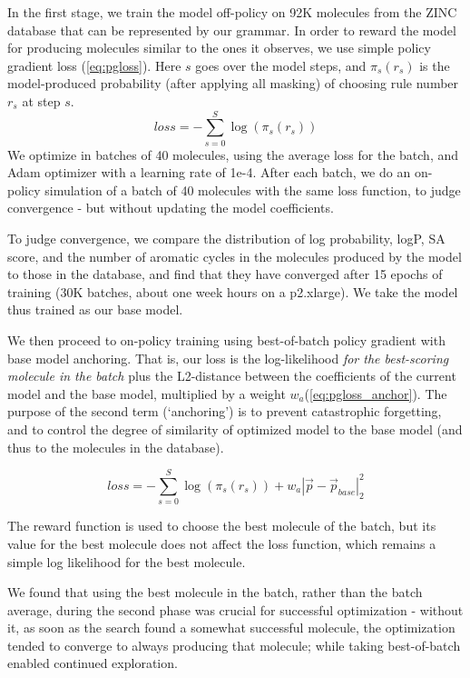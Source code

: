 \documentclass{article}
\begin{document}
In the first stage, we train the model off-policy on 92K molecules from the ZINC database  \cite{Weininger88} that can be represented by our grammar.  In order to reward the model for producing molecules similar to the ones it observes, we use simple policy gradient loss (\ref{eq:pgloss}). Here $s$ goes over the model steps, and $\pi_s\left(r_s\right)$ is the model-produced probability (after applying all masking) of choosing rule number $r_s$ at step $s$.
\begin{equation}\label{eq:pgloss}
loss = -\sum_{s=0}^S \log\left(\pi_s\left(r_s\right)\right)
\end{equation}
We optimize in batches of 40 molecules, using the average loss for the batch, and Adam optimizer with a learning rate of 1e-4. After each batch, we do an on-policy simulation of a batch of 40 molecules with the same loss function, to judge convergence - but without updating the model coefficients.

To judge convergence, we compare the distribution of log probability, logP, SA score, and the number of aromatic cycles in the molecules produced by the model to those in the database, and find that they have converged after 15 epochs of training (30K batches, about one week hours on a p2.xlarge). We take the model thus trained as our base model.


We then proceed to on-policy training using best-of-batch policy gradient with base model anchoring. That is, our loss is the log-likelihood \emph{for the best-scoring molecule in the batch} plus the L2-distance between the coefficients of the current model and the base model, multiplied by a weight $w_a$(\ref{eq:pgloss_anchor}). The purpose of the second term (`anchoring') is to prevent catastrophic forgetting, and to control the degree of similarity of optimized model to the base model (and thus to the molecules in the database).

\begin{equation}\label{eq:pgloss_anchor}
loss =- \sum_{s=0}^S \log\left(\pi_s\left(r_s\right)\right) + w_a\left| \vec p - \vec p_{base} \right|_2^2
\end{equation}

The reward function is used to choose the best molecule of the batch, but its value for the best molecule does not affect the loss function, which remains a simple log likelihood for the best molecule.

We found that using the best molecule in the batch, rather than the batch average, during the second phase was crucial for successful optimization - without it, as soon as the search found a somewhat successful molecule, the optimization tended to converge to always producing that molecule; while taking best-of-batch enabled continued exploration.
\end{document}
